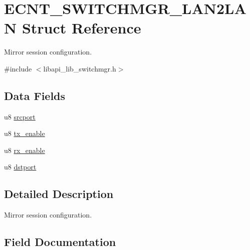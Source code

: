 \hypertarget{structECNT__SWITCHMGR__LAN2LAN}{}\section{E\+C\+N\+T\+\_\+\+S\+W\+I\+T\+C\+H\+M\+G\+R\+\_\+\+L\+A\+N2\+L\+AN Struct Reference}
\label{structECNT__SWITCHMGR__LAN2LAN}


Mirror session configuration.  




{\ttfamily \#include $<$libapi\+\_\+lib\+\_\+switchmgr.\+h$>$}

\subsection*{Data Fields}
\begin{DoxyCompactItemize}
\item 
u8 \hyperlink{structECNT__SWITCHMGR__LAN2LAN_a31e6e205d26219575b03a43629a270cc}{srcport}
\item 
u8 \hyperlink{structECNT__SWITCHMGR__LAN2LAN_a80e7f7fa0fc246d0f8fa85fa545c83e1}{tx\+\_\+enable}
\item 
u8 \hyperlink{structECNT__SWITCHMGR__LAN2LAN_a0653beb4cd22da16ec515da1ab9b9197}{rx\+\_\+enable}
\item 
u8 \hyperlink{structECNT__SWITCHMGR__LAN2LAN_ac409405a726933b3f73a8dcfa76105b2}{dstport}
\end{DoxyCompactItemize}


\subsection{Detailed Description}
Mirror session configuration. 

\subsection{Field Documentation}
\mbox{\label{structECNT__SWITCHMGR__LAN2LAN_ac409405a726933b3f73a8dcfa76105b2}} 

